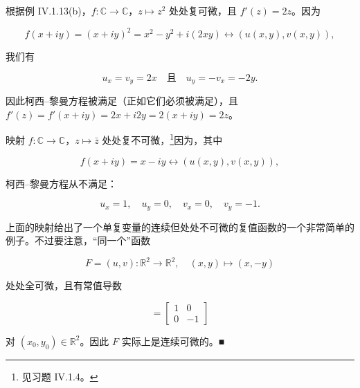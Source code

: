 \begin{example}

\begin{items}
\item

根据例 IV.1.13(b)，$ f : \mathbb{C} \to \mathbb{C} $，$ z \mapsto z^2 $ 处处复可微，且 $ f'(z) = 2z $。因为

\[
f(x + iy) = (x + iy)^2 = x^2 - y^2 + i(2xy) \leftrightarrow (u(x,y), v(x,y)) ,
\]

我们有

\[
u_x = v_y = 2x \quad \text{且} \quad u_y = -v_x = -2y .
\]

因此柯西–黎曼方程被满足（正如它们必须被满足），且 $ f'(z) = f'(x + iy) = 2x + i2y = 2(x + iy) = 2z $。

\item

映射 $ f : \mathbb{C} \to \mathbb{C} $，$ z \mapsto \bar{z} $ 处处复不可微，\footnote{见习题 IV.1.4。}因为，其中

\[
f(x + iy) = x - iy \leftrightarrow (u(x,y), v(x,y)) ,
\]

柯西–黎曼方程从不满足：

\[
u_x = 1 , \quad u_y = 0 , \quad v_x = 0 , \quad v_y = -1 .
\]

上面的映射给出了一个单复变量的连续但处处不可微的复值函数的一个非常简单的例子。不过要注意，“同一个”函数

\[
F = (u,v) : \mathbb{R}^2 \to \mathbb{R}^2 , \quad (x,y) \mapsto (x,-y)
\]

处处全可微，且有常值导数

\begin{equation*}
[\partial F(x_0, y_0)] = \begin{bmatrix} 1 & 0 \\ 0 & -1 \end{bmatrix}
\end{equation*}

对 $ (x_0, y_0) \in \mathbb{R}^2 $。因此 $ F $ 实际上是连续可微的。\nobreak\hspace{0.35em}■

\end{items}

\end{example}

\exerciseshead

